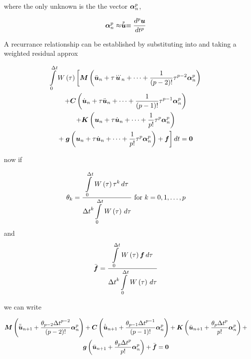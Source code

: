 where the only unknown is the the vector $\vect{\alpha}^{p}_{n}$,

\begin{equation}
  \vect{\alpha}^{p}_{n}\approx\symover{p}{\vect{u}}\equiv\dnby{p}{\vect{u}}{t}
\end{equation}

A recurrance relationship can be established by substituting
 into  and
taking a weighted residual approx

\begin{multline}
  \dintl{0}{\Delta
    t}\fnof{W}{\tau}\left[\matr{M}\pbrac{\ddot{\vect{u}}_{n}+\tau\dddot{\vect{u}}_{n}+\cdots+
    \dfrac{1}{\factorial{p-2}}\tau^{p-2}\vect{\alpha}^{p}_{n}} \right.\\
  +\matr{C}\pbrac{\dot{\vect{u}}_{n}+\tau\ddot{\vect{u}}_{n}+\cdots+
    \dfrac{1}{\factorial{p-1}}\tau^{p-1}\vect{\alpha}^{p}_{n}} \\
  +\matr{K}\pbrac{\vect{u}_{n}+\tau\dot{\vect{u}}_{n}+\cdots+
    \dfrac{1}{p!}\tau^{p}\vect{\alpha}^{p}_{n}} \\
  +\left.\fnof{\vect{g}}{\vect{u}_{n}+\tau\dot{\vect{u}}_{n}+\cdots+
    \dfrac{1}{p!}\tau^{p}\vect{\alpha}^{p}_{n}}+\vect{f}\right] dt = \vect{0}
\end{multline}

now if 

\begin{equation}
  \theta_{k}=\dfrac{  \displaystyle\int\limits_{0}^{\Delta t} \, W\left( \tau \right) \tau^{k}\,d\tau }{{\Delta
      t}^{k}  \displaystyle\int\limits_{0}^{\Delta t} \, W\left( \tau \right) \,d\tau } \text{  for  } k=0,1,\ldots,p
\end{equation}
and
\begin{equation}
  \bar{\vect{f}}=\dfrac{\gint{0}{\Delta t}{\fnof{W}{\tau}\vect{f}}{\tau}}{{\Delta
      t}^{k}\gint{0}{\Delta t}{\fnof{W}{\tau}}{\tau}}
\end{equation}

we can write

\begin{multline}
  \matr{M}\pbrac{\ddot{\bar{\vect{u}}}_{n+1}+\dfrac{\theta_{p-2}{\Delta
        t}^{p-2}}{\factorial{p-2}}\vect{\alpha}^{p}_{n}}+
  \matr{C}\pbrac{\dot{\bar{\vect{u}}}_{n+1}+\dfrac{\theta_{p-1}{\Delta
        t}^{p-1}}{\factorial{p-1}}\vect{\alpha}^{p}_{n}}+
  \matr{K}\pbrac{\bar{\vect{u}}_{n+1}+\dfrac{\theta_{p}{\Delta
        t}^{p}}{p!}\vect{\alpha}^{p}_{n}}+ \\
  \fnof{\vect{g}}{\bar{\vect{u}}_{n+1}+\dfrac{\theta_{p}{\Delta
        t}^{p}}{p!}\vect{\alpha}^{p}_{n}}+\bar{\vect{f}}=\vect{0}
\end{multline}

